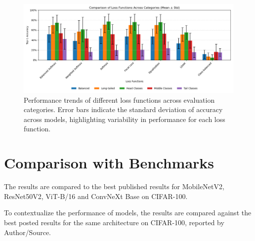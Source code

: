 \begin{figure}[h!]
    \centering
    \includegraphics[width=\textwidth]{Images/Plots/loss_function_bar_plot_mean_std.png}
    \caption{Performance trends of different loss functions across evaluation categories. Error bars indicate the standard deviation of accuracy across models, highlighting variability in performance for each loss function.}
    \label{fig:loss_comparison_bars}
\end{figure}

\section{Comparison with Benchmarks}
The results are compared to the best published results for MobileNetV2, ResNet50V2, ViT-B/16 and ConvNeXt Base on CIFAR-100.

To contextualize the performance of models, the results are compared against the best posted results for the same architecture on CIFAR-100, reported by Author/Source.




